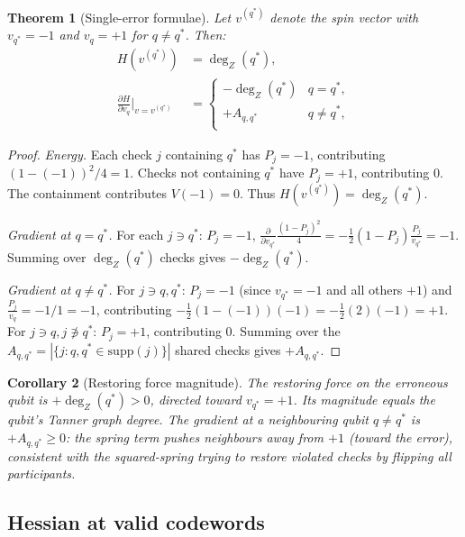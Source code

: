 \documentclass[12pt,a4paper]{article}
\theoremstyle{plain}
\newtheorem{theorem}{Theorem}[section]
\newtheorem{corollary}[theorem]{Corollary}
\theoremstyle{definition}
\theoremstyle{remark}
\newcommand{\dZ}{\operatorname{deg}_Z}
\begin{document}
\begin{theorem}[Single-error formulae]\label{thm:single_error}
Let $v^{(q^*)}$ denote the spin vector with $v_{q^*} = -1$ and
$v_q = +1$ for $q \neq q^*$. Then:
\begin{align}
  H(v^{(q^*)}) &= \dZ(q^*), \label{eq:single_energy} \\
  \frac{\partial H}{\partial v_q}\bigg|_{v = v^{(q^*)}} &=
    \begin{cases}
      -\dZ(q^*) & q = q^*, \\
      +A_{q,q^*} & q \neq q^*, \\
    \end{cases} \label{eq:single_grad}
\end{align}
\end{theorem}

\begin{proof}
\emph{Energy.}
Each check $j$ containing $q^*$ has $P_j = -1$,
contributing $(1-(-1))^2/4 = 1$.
Checks not containing $q^*$ have $P_j = +1$, contributing 0.
The containment contributes $V(-1) = 0$.
Thus $H(v^{(q^*)}) = \dZ(q^*)$.

\emph{Gradient at $q = q^*$.}
For each $j \ni q^*$: $P_j = -1$,
$\frac{\partial}{\partial v_{q^*}} \frac{(1-P_j)^2}{4}
  = -\frac{1}{2}(1-P_j)\frac{P_j}{v_{q^*}} = -1$.
Summing over $\dZ(q^*)$ checks gives $-\dZ(q^*)$.

\emph{Gradient at $q \neq q^*$.}
For $j \ni q, q^*$: $P_j = -1$ (since $v_{q^*}=-1$ and all others $+1$)
and $\frac{P_j}{v_q} = -1/1 = -1$,
contributing $-\frac{1}{2}(1-(-1))(-1) = -\frac{1}{2}(2)(-1) = +1$.
For $j \ni q, j \not\ni q^*$: $P_j = +1$, contributing 0.
Summing over the $A_{q,q^*} = |\{j : q,q^* \in \mathrm{supp}(j)\}|$ shared
checks gives $+A_{q,q^*}$.
\end{proof}

\begin{corollary}[Restoring force magnitude]
The restoring force on the erroneous qubit is $+\dZ(q^*) > 0$,
directed toward $v_{q^*} = +1$.
Its magnitude equals the qubit's Tanner graph degree.
The gradient at a neighbouring qubit $q \neq q^*$ is $+A_{q,q^*} \geq 0$:
the spring term \emph{pushes} neighbours away from $+1$ (toward the error),
consistent with the squared-spring trying to restore violated checks by
flipping all participants.
\end{corollary}

\subsection{Hessian at valid codewords}
\end{document}
